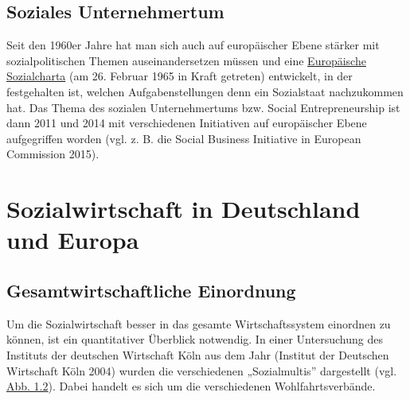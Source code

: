 \documentclass[
  letterpaper,
]{book}
\begin{document}
\subsection{Soziales Unternehmertum}\label{unternehmertum}

Seit den 1960er Jahre hat man sich auch auf europäischer Ebene stärker
mit sozialpolitischen Themen auseinandersetzen müssen und eine
\href{https://www.sozialcharta.eu/}{Europäische Sozialcharta} (am 26.
Februar 1965 in Kraft getreten) entwickelt, in der festgehalten ist,
welchen Aufgabenstellungen denn ein Sozialstaat nachzukommen hat. Das
Thema des sozialen Unternehmertums bzw. Social Entrepreneurship ist dann
2011 und 2014 mit verschiedenen Initiativen auf europäischer Ebene
aufgegriffen worden (vgl. z. B. die Social Business Initiative in
European Commission 2015).

\section{Sozialwirtschaft in Deutschland und Europa}\label{deutschland}

\subsection{Gesamtwirtschaftliche Einordnung}\label{gesamtwirtschaft}

Um die Sozialwirtschaft besser in das gesamte Wirtschaftssystem
einordnen zu können, ist ein quantitativer Überblick notwendig. In einer
Untersuchung des Instituts der deutschen Wirtschaft Köln aus dem Jahr
(Institut der Deutschen Wirtschaft Köln 2004) wurden die verschiedenen
„Sozialmultis'' dargestellt (vgl. \hyperref[figure12]{Abb. 1.2}). Dabei
handelt es sich um die verschiedenen Wohlfahrtsverbände.
\end{document}
